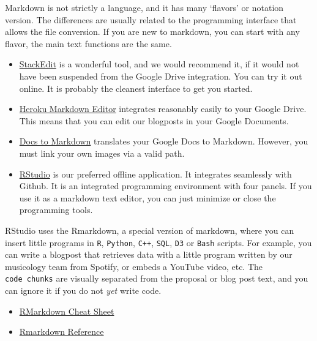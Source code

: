 \documentclass[
  a4paper,
  openany, a4paper, oneside]{book}
\providecommand{\tightlist}{%
  \setlength{\itemsep}{0pt}\setlength{\parskip}{0pt}}
\begin{document}
Markdown is not strictly a language, and it has many `flavors' or notation version. The differences are usually related to the programming interface that allows the file conversion. If you are new to markdown, you can start with any flavor, the main text functions are the same.

\begin{itemize}
\item
  \href{https://stackedit.io/}{StackEdit} is a wonderful tool, and we would recommend it, if it would not have been suspended from the Google Drive integration. You can try it out online. It is probably the cleanest interface to get you started.
\item
  \href{https://thumbsdb.herokuapp.com/markdown/}{Heroku Markdown Editor} integrates reasonably easily to your Google Drive. This means that you can edit our blogposts in your Google Documents.
\item
  \href{https://gsuite.google.com/marketplace/app/docs_to_markdown/700168918607}{Docs to Markdown} translates your Google Docs to Markdown. However, you must link your own images via a valid path.
\item
  \href{https://rstudio.com/}{RStudio} is our preferred offline application. It integrates seamlessly with Github. It is an integrated programming environment with four panels. If you use it as a markdown text editor, you can just minimize or close the programming tools.
\end{itemize}

RStudio uses the Rmarkdown, a special version of markdown, where you can insert little programs in \texttt{R}, \texttt{Python}, \texttt{C++}, \texttt{SQL}, \texttt{D3} or \texttt{Bash} scripts. For example, you can write a blogpost that retrieves data with a little program written by our musicology team from Spotify, or embeds a YouTube video, etc. The \texttt{code\ chunks} are visually separated from the proposal or blog post text, and you can ignore it if you do not \emph{yet} write code.

\begin{itemize}
\tightlist
\item
  \href{https://rstudio.com/wp-content/uploads/2016/03/rmarkdown-cheatsheet-2.0.pdf?_ga=2.126386957.1623649708.1603024238-59012930.1603024238}{RMarkdown Cheat Sheet}
\item
  \href{https://rstudio.com/wp-content/uploads/2015/03/rmarkdown-reference.pdf?_ga=2.68348561.1623649708.1603024238-59012930.1603024238}{Rmarkdown Reference}
\end{itemize}

  
\end{document}
